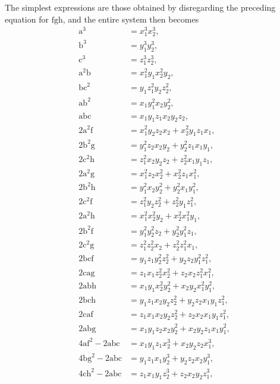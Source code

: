 \documentclass[11pt]{article}
\begin{document}
\noindent The simplest expressions are those obtained by disregarding the preceding equation for $\mathrm{fgh}$, and the entire system then becomes
\[
\begin{aligned}
\mathrm{a}^3 &= x_1^3 x_2^3,\\
\mathrm{b}^3 &= y_1^3 y_2^3,\\
\mathrm{c}^3 &= z_1^3 z_2^3,\\
\mathrm{a}^2\mathrm{b} &= x_1^2 y_1 x_2^2 y_2,\\
\mathrm{bc}^2 &= y_1 z_1^2 y_2 z_2^2,\\
\mathrm{ab}^2 &= x_1 y_1^2 x_2 y_2^2,\\
\mathrm{abc} &= x_1 y_1 z_1 x_2 y_2 z_2,\\
2\mathrm{a}^2\mathrm{f} &= x_1^2 y_2 z_2 x_2 + x_2^2 y_1 z_1 x_1,\\
2\mathrm{b}^2\mathrm{g} &= y_1^2 z_2 x_2 y_2 + y_2^2 z_1 x_1 y_1,\\
2\mathrm{c}^2\mathrm{h} &= z_1^2 x_2 y_2 z_2 + z_2^2 x_1 y_1 z_1,\\
2\mathrm{a}^2\mathrm{g} &= x_1^2 z_2 x_2^2 + x_2^2 z_1 x_1^2,\\
2\mathrm{b}^2\mathrm{h} &= y_1^2 x_2 y_2^2 + y_2^2 x_1 y_1^2,\\
2\mathrm{c}^2\mathrm{f} &= z_1^2 y_2 z_2^2 + z_2^2 y_1 z_1^2,\\
2\mathrm{a}^2\mathrm{h} &= x_1^2 x_2^2 y_2 + x_2^2 x_1^2 y_1,\\
2\mathrm{b}^2\mathrm{f} &= y_1^2 y_2^2 z_2 + y_2^2 y_1^2 z_1,\\
2\mathrm{c}^2\mathrm{g} &= z_1^2 z_2^2 x_2 + z_2^2 z_1^2 x_1,\\
2\mathrm{bcf} &= y_1 z_1 y_2^2 z_2^2 + y_2 z_2 y_1^2 z_1^2,\\
2\mathrm{cag} &= z_1 x_1 z_2^2 x_2^2 + z_2 x_2 z_1^2 x_1^2,\\
2\mathrm{abh} &= x_1 y_1 x_2^2 y_2^2 + x_2 y_2 x_1^2 y_1^2,\\
2\mathrm{bch} &= y_1 z_1 x_2 y_2 z_2^2 + y_2 z_2 x_1 y_1 z_1^2,\\
2\mathrm{caf} &= z_1 x_1 x_2 y_2 z_2^2 + z_2 x_2 x_1 y_1 z_1^2,\\
2\mathrm{abg} &= x_1 y_1 z_2 x_2 y_2^2 + x_2 y_2 z_1 x_1 y_1^2,\\
4\mathrm{af}^2 - 2\mathrm{abc} &= x_1 y_1 z_1 x_2^3 + x_2 y_2 z_2 x_1^3,\\
4\mathrm{bg}^2 - 2\mathrm{abc} &= y_1 z_1 x_1 y_2^3 + y_2 z_2 x_2 y_1^3,\\
4\mathrm{ch}^2 - 2\mathrm{abc} &= z_1 x_1 y_1 z_2^3 + z_2 x_2 y_2 z_1^3,\\

\end{aligned}\]
\end{document}
